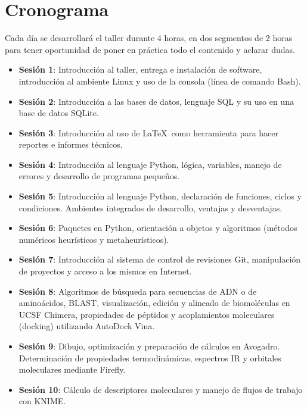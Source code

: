 \documentclass[10pt,letterpaper]{article}
\begin{document}
\section{Cronograma}
Cada d\'ia se desarrollar\'a el taller durante 4 horas, en dos segmentos de 2 horas para tener oportunidad de poner en pr\'actica todo el contenido y aclarar dudas.

\begin{itemize}
\item \textbf{Sesi\'on 1}: Introducci\'on al taller, entrega e instalaci\'on de software, introducci\'on al ambiente Linux y uso de la consola (l\'inea de comando Bash).
\item \textbf{Sesi\'on 2}: Introducci\'on a las bases de datos, lenguaje SQL y su uso en una base de datos SQLite.
\item \textbf{Sesi\'on 3}: Introducci\'on al uso de \LaTeX\ como herramienta para hacer reportes e informes t\'ecnicos.
\item \textbf{Sesi\'on 4}: Introducci\'on al lenguaje Python, l\'ogica, variables, manejo de errores y desarrollo de programas peque\~nos.
\item \textbf{Sesi\'on 5}: Introducci\'on al lenguaje Python, declaraci\'on de funciones, ciclos y condiciones. Ambientes integrados de desarrollo, ventajas y desventajas.
\item \textbf{Sesi\'on 6}: Paquetes en Python, orientaci\'on a objetos y algoritmos (m\'etodos num\'ericos heur\'isticos y metaheur\'isticos).
\item \textbf{Sesi\'on 7}: Introducci\'on al sistema de control de revisiones Git, manipulaci\'on de proyectos y acceso a los mismos en Internet.
\item \textbf{Sesi\'on 8}: Algoritmos de b\'usqueda para secuencias de ADN o de amino\'acidos, BLAST, visualizaci\'on, edici\'on y alineado de biomol\'eculas en UCSF Chimera, propiedades de p\'eptidos y acoplamientos moleculares (docking) utilizando AutoDock Vina.
\item \textbf{Sesi\'on 9}: Dibujo, optimizaci\'on y preparaci\'on de c\'alculos en Avogadro. Determinaci\'on de propiedades termodin\'amicas, espectros IR y orbitales moleculares mediante Firefly. 
\item \textbf{Sesi\'on 10}: C\'alculo de descriptores moleculares y manejo de flujos de trabajo con KNIME.
\end{itemize}
\end{document}
